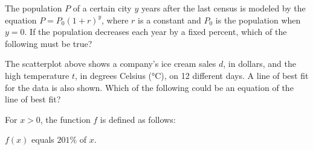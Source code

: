 \noindent\markforreview
\vspace{1em}

The population $P$ of a certain city $y$ years after the last census is modeled by the equation  
$P = P_0(1 + r)^y$, where $r$ is a constant and $P_0$ is the population when $y = 0$.  
If the population decreases each year by a fixed percent, which of the following must be true?

\vspace{0.75em}

\newpage
\vspace{2em}

\noindent\markforreview
\vspace{1em}

\begin{center}

\end{center}

The scatterplot above shows a company’s ice cream sales $d$, in dollars, and the high temperature $t$, in degrees Celsius (°C), on 12 different days.  
A line of best fit for the data is also shown.  
Which of the following could be an equation of the line of best fit?

\vspace{0.75em}


\newpage
\noindent\markforreview
\vspace{1em}

For $x > 0$, the function $f$ is defined as follows:  
\begin{center}

$f(x)$ equals $201\%$ of $x$.
\end{center}

